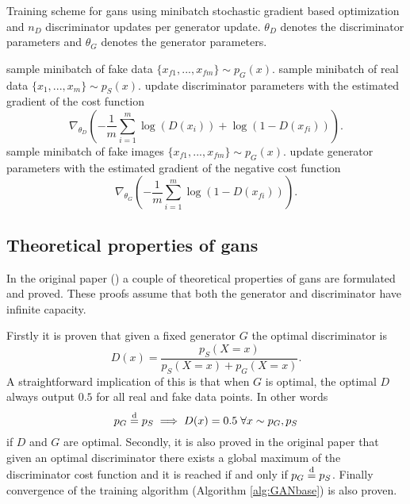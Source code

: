 \begin{algorithm}
    \caption{Training scheme for \acrlong{gans} using minibatch stochastic gradient based optimization and $n_D$ discriminator updates per generator update. $\theta_D$ denotes the discriminator parameters and $\theta_G$ denotes the generator parameters.}
    \label{alg:GANbase}
    \begin{algorithmic}[1]
        \STATE sample minibatch of fake data $\{x_{f1}, ..., x_{fm}\} \sim p_G(x)$.
        \STATE sample minibatch of real data $\{x_{1}, ..., x_{m}\} \sim p_S(x)$.
        \STATE update discriminator parameters with the estimated gradient of the cost function
        \begin{equation}
            \nonumber
            \nabla_{\theta_D} \left( -\frac{1}{m}\sum_{i=1}^m\log(D(x_i)) + \log(1-D(x_{fi})) \right).
        \end{equation}
        \ENDFOR
        \STATE sample minibatch of fake images $\{x_{f1}, ..., x_{fm}\} \sim p_G(x)$.
        \STATE update generator parameters with the estimated gradient of the negative cost function
        \begin{equation}
            \nonumber
            \nabla_{\theta_G} \left( - \frac{1}{m}\sum_{i=1}^m\log(1-D(x_{fi})) \right).
        \end{equation}
        \ENDFOR
    \end{algorithmic}
\end{algorithm}


\subsection{Theoretical properties of \acrshort{gans}}
In the original paper (\textcite{goodfellow2014generative}) a couple of theoretical properties of \acrshort{gans} are formulated and proved. These proofs assume that both the generator and discriminator have infinite capacity.

Firstly it is proven that given a fixed generator $G$ the optimal discriminator is 
\begin{equation}
    D(x) = \frac{p_S(X=x)}{p_S(X=x) + p_G(X=x)}.
\end{equation}
A straightforward implication of this is that when $G$ is optimal, the optimal $D$ always output $0.5$ for all real and fake data points. In other words
\begin{equation}
    p_G \stackrel{\text{d}}{=} p_S \implies D(x) = 0.5 \; \forall x \sim p_G, p_S
\end{equation}
if $D$ and $G$ are optimal. Secondly, it is also proved in the original paper that given an optimal discriminator there exists a global maximum of the discriminator cost function and it is reached if and only if $p_G \stackrel{\text{d}}{=} p_S$. Finally convergence of the training algorithm (Algorithm \ref{alg:GANbase}) is also proven.

